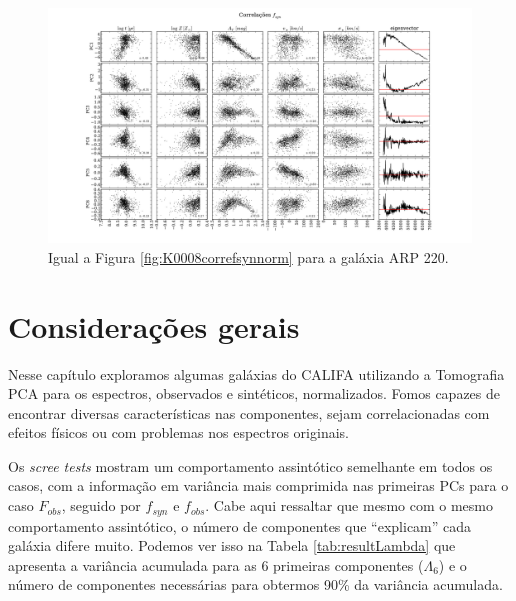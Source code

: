 \begin{figure}
    \includegraphics[width=1.3\textwidth, angle=-90]{figuras/K0802-correl-f_syn_norm-PCvsPhys.pdf}
	\caption[Correlações PCs vs. par\^ametros f\'isicos - $f_{syn}$ - ARP 220.]
	{Igual a Figura \ref{fig:K0008correfsynnorm} para a galáxia ARP 220.}
    \label{fig:K0802correfsynnorm}
\end{figure}

\section{Considerações gerais}

Nesse capítulo exploramos algumas galáxias do CALIFA utilizando a Tomografia PCA para os espectros, observados e
sintéticos, normalizados. Fomos capazes de encontrar diversas características nas componentes, sejam correlacionadas com
efeitos físicos ou com problemas nos espectros originais.

Os {\em scree tests} mostram um comportamento assintótico semelhante em todos os casos, com a informação em variância
mais comprimida nas primeiras PCs para o caso $F_{obs}$, seguido por $f_{syn}$ e $f_{obs}$. Cabe aqui ressaltar que mesmo com
o mesmo comportamento assintótico, o número de componentes que ``explicam'' cada galáxia difere muito. Podemos ver isso
na Tabela \ref{tab:resultLambda} que apresenta a variância acumulada para as 6 primeiras componentes ($\Lambda_6$) e o
número de componentes necessárias para obtermos 90\% da variância acumulada.

